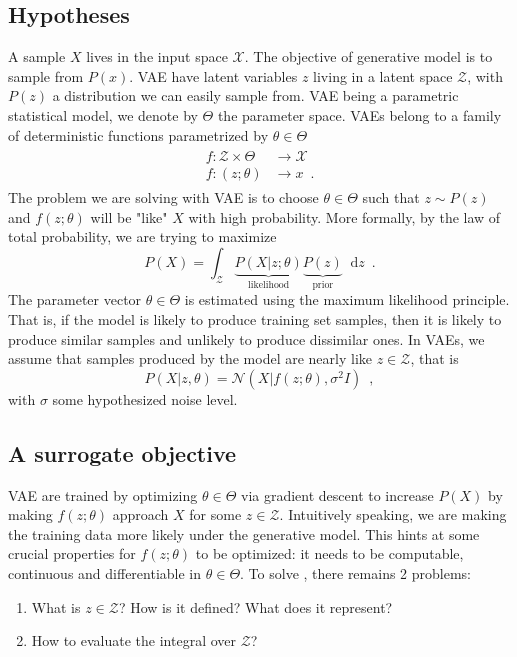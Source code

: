 \documentclass[12pt]{article}
\newcommand*\diff{\mathop{}\!\mathrm{d}}
\begin{document}
\subsection{Hypotheses}
%
A sample $X$ lives in the input space $\mathcal{X}$.
The objective of generative model is to sample from $P(x)$.
VAE have latent variables $z$ living in a latent space $\mathcal{Z}$, with $P(z)$ a distribution we can easily sample from.
VAE being a parametric statistical model, we denote by $\Theta$ the parameter space.
%
VAEs belong to a family of deterministic functions parametrized by $\theta \in \Theta$
%
\begin{align}
    \begin{split}
    f : \mathcal{Z} \times \Theta &\rightarrow \mathcal{X} \\
    f : (z; \theta) &\rightarrow x
    \enspace .
    \end{split}
\end{align}
%
The problem we are solving with VAE is to choose $\theta \in \Theta$ such that $z \sim P(z)$ and $f(z;\theta)$ will be "like" $X$ with high probability.
More formally, by the law of total probability, we are trying to maximize
%
\begin{equation}
    \label{eq:law_tot_proba}
    P(X) = \int_{\mathcal{Z}}
    \underbrace{P(X \vert z; \theta)}_\textrm{likelihood}
    \underbrace{P(z)}_\textrm{prior}
    \diff z
    \enspace .
\end{equation}
%
The parameter vector $\theta \in \Theta$ is estimated using the maximum likelihood principle.
That is, if the model is likely to produce training set samples, then it is likely to produce similar samples and unlikely to produce dissimilar ones.
In VAEs, we assume that samples produced by the model are nearly like $z \in \mathcal{Z}$, that is
%
\begin{equation}
    P(X \vert z, \theta) = \mathcal{N}(X \vert f(z;\theta), \sigma^2 I)
    \enspace ,
\end{equation}
%
with $\sigma$ some hypothesized noise level.
%
\subsection{A surrogate objective}
%
VAE are trained by optimizing $\theta \in \Theta$ via gradient descent to increase $P(X)$ by making $f(z;\theta)$ approach $X$ for some $z \in \mathcal{Z}$.
Intuitively speaking, we are making the training data more likely under the generative model.
This hints at some crucial properties for $f(z;\theta)$ to be optimized: it needs to be computable, continuous and differentiable in $\theta \in \Theta$.
To solve , there remains 2 problems:
%
\begin{enumerate}
    \item What is $z \in \mathcal{Z}$? How is it defined? What does it represent?
    \item How to evaluate the integral over $\mathcal{Z}$?
\end{enumerate}
%
\end{document}
